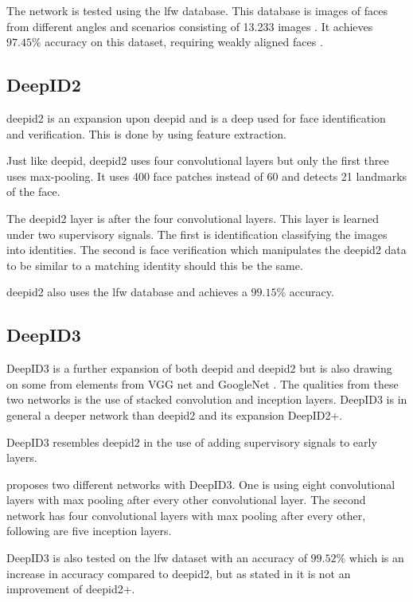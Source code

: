 The network is tested using the \gls{lfw} database. This database is images of faces from different angles and scenarios consisting of 13.233 images \citep{lfw2007}. It achieves $97.45\%$ accuracy on this dataset, requiring weakly aligned faces \citep{deepID2014}.

\subsection{DeepID2}
\gls{deepid2} is an expansion upon \gls{deepid} and is a deep  used for face identification and verification. This is done by using feature extraction.

Just like \gls{deepid}, \gls{deepid2} uses four convolutional layers but only the first three uses max-pooling. It uses 400 face patches instead of 60 \citep{deepID2014,sun2014} and detects 21 landmarks of the face.

The \gls{deepid2} layer is after the four convolutional layers. This layer is learned under two supervisory signals. The first is identification classifying the images into identities. The second is face verification which manipulates the \gls{deepid2} data to be similar to a matching identity should this be the same.

\gls{deepid2} also uses the \gls{lfw} database and achieves a $99.15\%$ accuracy.

\subsection{DeepID3}
DeepID3 is a further expansion of both \gls{deepid} and \gls{deepid2} but is also drawing on some from elements from VGG net and GoogleNet \citep{sun2015}. The qualities from these two networks is the use of stacked convolution and inception layers. DeepID3 is in general a deeper network than \gls{deepid2} and its expansion DeepID2+.

DeepID3 resembles \gls{deepid2} in the use of adding supervisory signals to early layers.

\cite{sun2015} proposes two different networks with DeepID3. One is using eight convolutional layers with max pooling after every other convolutional layer. The second network has four convolutional layers with max pooling after every other, following are five inception layers.

DeepID3 is also tested on the \gls{lfw} dataset with an accuracy of $99.52\%$ which is an increase in accuracy compared to \gls{deepid2}, but as stated in \cite{sun2015} it is not an improvement of \gls{deepid2}+.